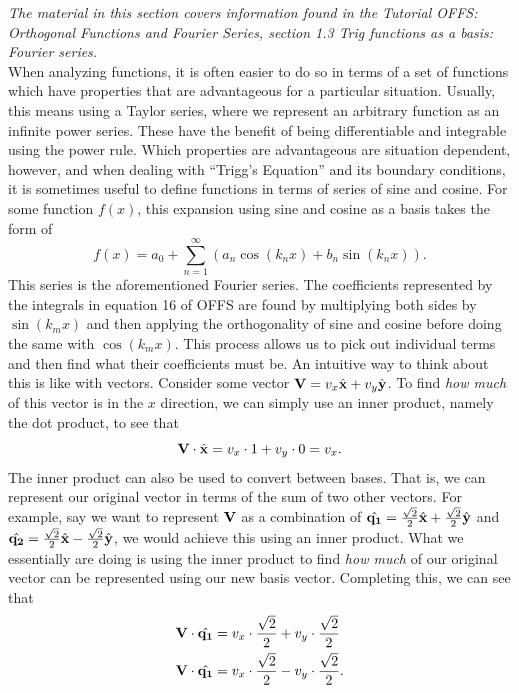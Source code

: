 \documentclass[11pt]{report}
\newcommand{\fpar}[1]{\left({#1}\right)}
\begin{document}
\emph{The material in this section covers information found in the Tutorial OFFS: Orthogonal Functions and Fourier Series, section 1.3 Trig functions as a basis: Fourier series.}\\

When analyzing functions, it is often easier to do so in terms of a set of functions which have properties that are advantageous for a particular situation. Usually, this means using a Taylor series, where we represent an arbitrary function as an infinite power series. These have the benefit of being differentiable and integrable using the power rule. Which properties are advantageous are situation dependent, however, and when dealing with ``Trigg's Equation'' and its boundary conditions, it is sometimes useful to define functions in terms of series of sine and cosine. For some function $f(x)$, this expansion using sine and cosine as a basis takes the form of
    \begin{equation}
        f(x) = a_0+\sum_{n=1}^\infty\fpar{a_n\cos\fpar{k_n x}+b_n\sin\fpar{k_nx}}.
    \end{equation}
This series is the aforementioned Fourier series. The coefficients represented by the integrals in equation 16 of OFFS are found by multiplying both sides by $\sin\fpar{k_m x}$ and then applying the orthogonality of sine and cosine before doing the same with $\cos\fpar{k_m x}$. This process allows us to pick out individual terms and then find what their coefficients must be. An intuitive way to think about this is like with vectors. Consider some vector $\bold{V}=v_x\hat{\bold{x}}+v_y\hat{\bold{y}}$. To find \emph{how much} of this vector is in the $x$ direction, we can simply use an inner product, namely the dot product, to see that
    \[\bold{V}\cdot\hat{\bold{x}}=v_x\cdot1+v_y\cdot0=v_x.\]
The inner product can also be used to convert between bases. That is, we can represent our original vector in terms of the sum of two other vectors. For example, say we want to represent $\bold{V}$ as a combination of $\hat{\bold{q_1}}=\frac{\sqrt{2}}{2}\hat{\bold{x}}+\frac{\sqrt{2}}{2}\hat{\bold{y}}$ and $\hat{\bold{q_2}}=\frac{\sqrt{2}}{2}\hat{\bold{x}}-\frac{\sqrt{2}}{2}\hat{\bold{y}}$, we would achieve this using an inner product. What we essentially are doing is using the inner product to find \emph{how much} of our original vector can be represented using our new basis vector. Completing this, we can see that
    \begin{align*}
        \bold{V}\cdot\hat{\bold{q_1}} &= v_x\cdot\frac{\sqrt{2}}{2}+v_y\cdot\frac{\sqrt{2}}{2}\\
        \bold{V}\cdot\hat{\bold{q_1}} &= v_x\cdot\frac{\sqrt{2}}{2}-v_y\cdot\frac{\sqrt{2}}{2}.
    \end{align*}
\end{document}
